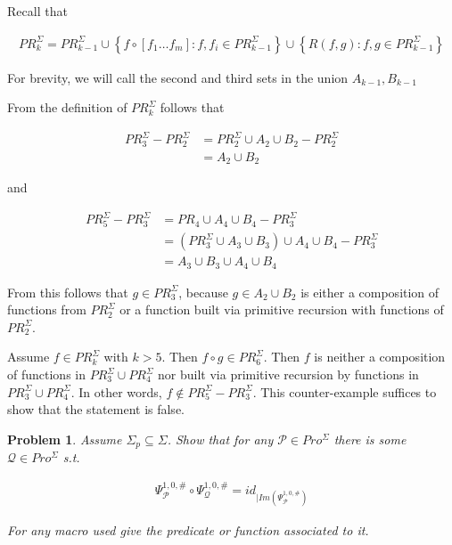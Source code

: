 \documentclass[a4paper, 12pt]{article}
\newtheorem{problem}{Problem}
\newtheorem{problem}{Problem}
\begin{document}
Recall that 

\begin{align*}
    PR_{k}^{\Sigma} = PR_{k-1}^{\Sigma} \cup \left\{ f \circ [f_1\ldots f_m] :
    f, f_i \in PR_{k-1}^{\Sigma} \right\}  \cup \left\{ R(f, g) : f, g \in
PR_{k-1}^{\Sigma} \right\} 
\end{align*}

For brevity, we will call the second and third sets in the union $A_{k-1},
B_{k-1}$

From the definition of $PR_k^{\Sigma}$ follows that

\begin{align*}
    PR_3^{\Sigma} - PR_2^{\Sigma} &= PR_{2}^{\Sigma} \cup A_2 \cup B_2
     - PR_2^{\Sigma}\\ 
                                  &= A_2 \cup B_2
\end{align*}

and 

\begin{align*}
    PR_5^{\Sigma} - PR_3^{\Sigma} &= PR_4 \cup A_4 \cup B_4 - PR_3^{\Sigma} \\ 
                                  &= (PR_3^{\Sigma} \cup A_3 \cup B_3) \cup A_4
                                  \cup B_4 - PR_3^{\Sigma} \\ 
                                  &=A_3 \cup B_3 \cup A_4 \cup B_4
\end{align*}

From this follows that $g \in PR_3^{\Sigma}$, because $g \in A_2 \cup B_2$ is
either a composition of functions from $PR_2^{\Sigma}$ or a function built via
primitive recursion with functions of $PR_{2}^{\Sigma}$.

Assume $f \in PR_k^{\Sigma}$ with $k > 5$. Then $f \circ g \in PR_6^{\Sigma}$.
Then $f$ is neither a composition of functions in $PR_3^{\Sigma} \cup
PR_{4}^{\Sigma}$ nor built via primitive recursion by functions in
$PR_3^{\Sigma} \cup PR_4^{\Sigma}$. In other words, $f \not\in PR_5^{\Sigma} -
PR_3^{\Sigma}$. This counter-example suffices to show that the statement is
false.

\pagebreak 

\begin{problem}
    Assume $\Sigma_p \subseteq \Sigma$. Show that for any $\mathcal{P} \in
    Pro^{\Sigma}$ there is some $\mathcal{Q} \in Pro^{\Sigma}$ s.t. 

    \begin{align*}
        \Psi_{\mathcal{P}}^{1, 0, \#} \circ \Psi_{\mathcal{Q}}^{1, 0, \#} =
        id_{| Im(\Psi_{\mathcal{P}}^{1, 0, \#})}
    \end{align*}


    For any macro used give the predicate or function associated to it.
\end{problem}
\end{document}
